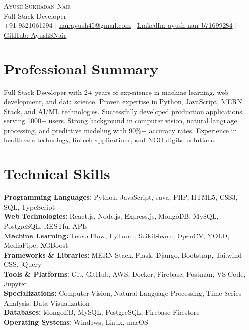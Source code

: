 \documentclass[letterpaper,11pt]{article}
\begin{document}
\begin{center}
    {\Huge \scshape Ayush Sukhadan Nair} \\ \vspace{1pt}
    Full Stack Developer \\ \vspace{1pt}
    \small +91 9321061394 $|$ \href{mailto:nairayush45@gmail.com}{nairayush45@gmail.com} $|$ 
    \href{https://www.linkedin.com/in/ayush-nair-b71699284/}{LinkedIn: ayush-nair-b71699284} $|$
    \href{https://github.com/AyushSNair}{GitHub: AyushSNair}
    \vspace{-8pt}
\end{center}

\section{Professional Summary}
\small{Full Stack Developer with 2+ years of experience in machine learning, web development, and data science. Proven expertise in Python, JavaScript, MERN Stack, and AI/ML technologies. Successfully developed production applications serving 1000+ users. Strong background in computer vision, natural language processing, and predictive modeling with 90\%+ accuracy rates. Experience in healthcare technology, fintech applications, and NGO digital solutions.}
\vspace{-10pt}

\section{Technical Skills}
\small{
\textbf{Programming Languages:} Python, JavaScript, Java, PHP, HTML5, CSS3, SQL, TypeScript \\
\textbf{Web Technologies:} React.js, Node.js, Express.js, MongoDB, MySQL, PostgreSQL, RESTful APIs \\
\textbf{Machine Learning:} TensorFlow, PyTorch, Scikit-learn, OpenCV, YOLO, MediaPipe, XGBoost \\
\textbf{Frameworks \& Libraries:} MERN Stack, Flask, Django, Bootstrap, Tailwind CSS, jQuery \\
\textbf{Tools \& Platforms:} Git, GitHub, AWS, Docker, Firebase, Postman, VS Code, Jupyter \\
\textbf{Specializations:} Computer Vision, Natural Language Processing, Time Series Analysis, Data Visualization \\
\textbf{Databases:} MongoDB, MySQL, PostgreSQL, Firebase Firestore \\
\textbf{Operating Systems:} Windows, Linux, macOS
}
\vspace{-10pt}
\end{document}
